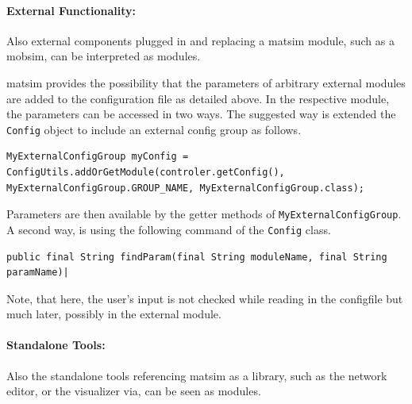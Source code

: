 
\paragraph{External Functionality:} %
Also external components plugged in and replacing a \gls{matsim} module, such as a \gls{mobsim}, can be interpreted as modules.

\gls{matsim} provides the possibility that the parameters of arbitrary external modules are added to the configuration file as detailed above. In the respective module, the parameters can be accessed in two ways. The suggested way is extended the \lstinline|Config| object to include an external config group as follows.
%
\begin{lstlisting}
MyExternalConfigGroup myConfig = ConfigUtils.addOrGetModule(controler.getConfig(), MyExternalConfigGroup.GROUP_NAME, MyExternalConfigGroup.class);
\end{lstlisting}
%
Parameters are then available by the getter methods of \lstinline|MyExternalConfigGroup|. A second way, is using the following command of the \lstinline|Config| class.
\begin{lstlisting}
public final String findParam(final String moduleName, final String paramName)| 
\end{lstlisting}
Note, that here, the user's input is not checked while reading in the \gls{configfile} but much later, possibly in the external module.


\paragraph{Standalone Tools:} %
Also the standalone tools referencing \gls{matsim} as a library, such as the network editor, or the visualizer via, can be seen as modules.



